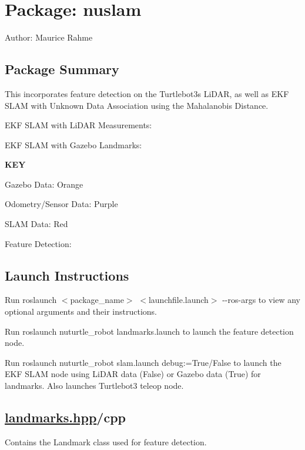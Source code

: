 \section*{Package\+: nuslam}

Author\+: Maurice Rahme

\subsection*{Package Summary}

This incorporates feature detection on the Turtlebot3\textquotesingle{}s Li\+D\+AR, as well as E\+KF S\+L\+AM with Unknown Data Association using the Mahalanobis Distance.

E\+KF S\+L\+AM with Li\+D\+AR Measurements\+:



E\+KF S\+L\+AM with Gazebo Landmarks\+:



{\bfseries K\+EY}
\begin{DoxyItemize}
\item Gazebo Data\+: Orange
\item Odometry/\+Sensor Data\+: Purple
\item S\+L\+AM Data\+: Red
\end{DoxyItemize}

Feature Detection\+:



\subsection*{Launch Instructions}

Run {\ttfamily roslaunch $<$package\+\_\+name$>$ $<$launchfile.\+launch$>$ -\/-\/ros-\/args} to view any optional arguments and their instructions.

Run {\ttfamily roslaunch nuturtle\+\_\+robot landmarks.\+launch} to launch the feature detection node.

Run {\ttfamily roslaunch nuturtle\+\_\+robot slam.\+launch debug\+:=True/\+False} to launch the E\+KF S\+L\+AM node using Li\+D\+AR data (False) or Gazebo data (True) for landmarks. Also launches Turtlebot3 teleop node.

\subsection*{\hyperlink{landmarks_8hpp}{landmarks.\+hpp}/cpp}

Contains the {\ttfamily Landmark} class used for feature detection.

